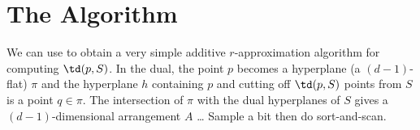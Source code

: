 \documentclass{article}
\begin{document}
\section{The Algorithm}

We can use  to obtain a very simple additive
$r$-approximation algorithm for computing $\td(p,S)$.  In the dual,
the point $p$ becomes a hyperplane (a $(d-1)$-flat) $\pi$ and the
hyperplane $h$ containing $p$ and cutting off $\td(p,S)$ points from
$S$ is a point $q\in \pi$.
The
intersection of $\pi$ with the dual hyperplanes of $S$ gives a
$(d-1)$-dimensional arrangement $A$ \ldots 
Sample a bit then do sort-and-scan.
\end{document}
